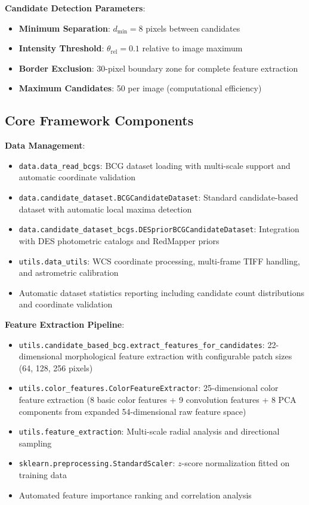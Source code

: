 \documentclass[twocolumn,10pt]{aastex631}
\begin{document}
\textbf{Candidate Detection Parameters}:
\begin{itemize}
\item \textbf{Minimum Separation}: $d_{\text{min}} = 8$ pixels between candidates
\item \textbf{Intensity Threshold}: $\theta_{\text{rel}} = 0.1$ relative to image maximum
\item \textbf{Border Exclusion}: 30-pixel boundary zone for complete feature extraction
\item \textbf{Maximum Candidates}: 50 per image (computational efficiency)
\end{itemize}

\subsection{Core Framework Components}

\textbf{Data Management}:
\begin{itemize}
\item \texttt{data.data\_read\_bcgs}: BCG dataset loading with multi-scale support and automatic coordinate validation
\item \texttt{data.candidate\_dataset.BCGCandidateDataset}: Standard candidate-based dataset with automatic local maxima detection
\item \texttt{data.candidate\_dataset\_bcgs.DESpriorBCGCandidateDataset}: Integration with DES photometric catalogs and RedMapper priors
\item \texttt{utils.data\_utils}: WCS coordinate processing, multi-frame TIFF handling, and astrometric calibration
\item Automatic dataset statistics reporting including candidate count distributions and coordinate validation
\end{itemize}

\textbf{Feature Extraction Pipeline}:
\begin{itemize}
\item \texttt{utils.candidate\_based\_bcg.extract\_features\_for\_candidates}: 22-dimensional morphological feature extraction with configurable patch sizes (64, 128, 256 pixels)
\item \texttt{utils.color\_features.ColorFeatureExtractor}: 25-dimensional color feature extraction (8 basic color features + 9 convolution features + 8 PCA components from expanded 54-dimensional raw feature space)
\item \texttt{utils.feature\_extraction}: Multi-scale radial analysis and directional sampling
\item \texttt{sklearn.preprocessing.StandardScaler}: $z$-score normalization fitted on training data
\item Automated feature importance ranking and correlation analysis
\end{itemize}
\end{document}
